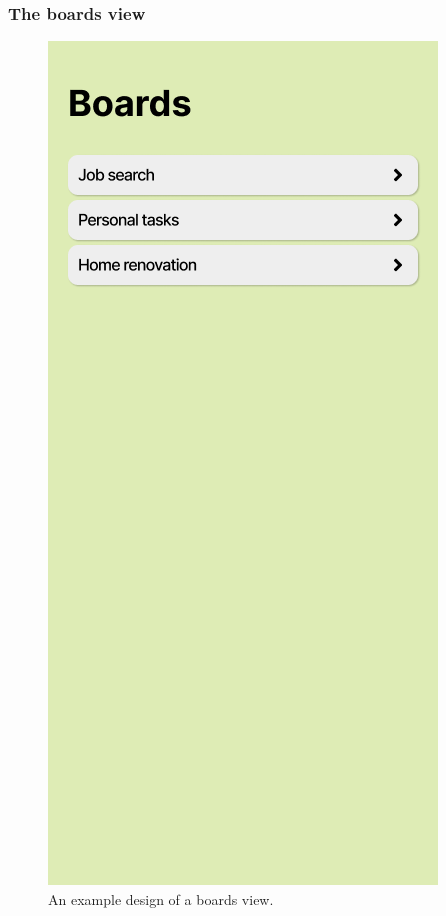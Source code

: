 \subsubsection{The boards view}

\begin{figure}
    \centering
    \begin{minipage}{0.45\textwidth}
        \centering
        \includegraphics[height=0.4\textheight]{./3-research-methodology/boards-view}
        \caption{An example design of a boards view.}
        \label{fig:3-4-boards-view}
    \end{minipage}

\end{figure}
